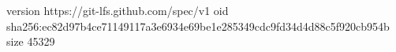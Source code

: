 version https://git-lfs.github.com/spec/v1
oid sha256:ec82d97b4ce71149117a3e6934e69be1e285349cdc9fd34d4d88c5f920cb954b
size 45329
